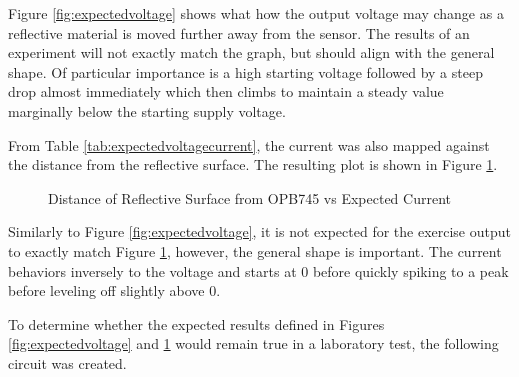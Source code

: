 \documentclass[conference]{IEEEtran}
\begin{document}
Figure \ref{fig:expectedvoltage} shows what how the output voltage may change as a reflective material is moved further away from the sensor. The results of an experiment will not exactly match the graph, but should align with the general shape. Of particular importance is a high starting voltage followed by a steep drop almost immediately which then climbs to maintain a steady value marginally below the starting supply voltage.

From Table \ref{tab:expectedvoltagecurrent}, the current was also mapped against the distance from the reflective surface. The resulting plot is shown in Figure \ref{fig:expectedcurrent}.

\begin{figure}[htbp]
    \caption{Distance of Reflective Surface from OPB745 vs Expected Current}
    \label{fig:expectedcurrent}
\end{figure}

Similarly to Figure \ref{fig:expectedvoltage}, it is not expected for the exercise output to exactly match Figure \ref{fig:expectedcurrent}, however, the general shape is important. The current behaviors inversely to the voltage and starts at 0 before quickly spiking to a peak before leveling off slightly above 0.

To determine whether the expected results defined in Figures \ref{fig:expectedvoltage} and \ref{fig:expectedcurrent} would remain true in a laboratory test, the following circuit was created.
\end{document}

